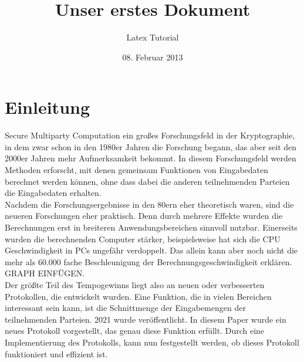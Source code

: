 \documentclass[a4paper,10pt]{scrartcl}
\title{Unser erstes Dokument}
\author{Latex Tutorial}
\date{08. Februar 2013}
\begin{document}
\maketitle
\tableofcontents

\newpage


\section{Einleitung}
Secure Multiparty Computation ein großes Forschungsfeld in der Kryptographie, in dem zwar schon in den 1980er Jahren die Forschung begann, das aber seit den 2000er Jahren mehr Aufmerksamkeit bekommt. \cite{Kogan2021}
In diesem Forschungsfeld werden Methoden erforscht, mit denen gemeinsam Funktionen von Eingabedaten berechnet werden können, ohne dass dabei die anderen teilnehmenden Parteien die Eingabedaten erhalten.\\
Nachdem die Forschungsergebnisse in den 80ern eher theoretisch waren, sind die neueren Forschungen eher praktisch. Denn durch mehrere Effekte wurden die Berechnungen erst in breiteren Anwendungsbereichen sinnvoll nutzbar. Einerseits wurden die berechnenden Computer stärker, beispielsweise hat sich die CPU Geschwindigkeit in PCs ungefähr verdoppelt. Das allein kann aber noch nicht die mehr als 60.000 fache Beschleunigung der Berechnungsgeschwindigkeit erklären. \cite{Kogan2021}
GRAPH EINFÜGEN.\\
Der größte Teil des Tempogewinns liegt also an neuen oder verbesserten Protokollen, die entwickelt wurden. Eine Funktion, die in vielen Bereichen interessant sein kann, ist die Schnittmenge der Eingabemengen der teilnehmenden Parteien. 2021 wurde \cite{Doettling2021} veröffentlicht. In diesem Paper wurde ein neues Protokoll vorgestellt, das genau diese Funktion erfüllt. Durch eine Implementierung des Protokolls, kann nun festgestellt werden, ob dieses Protokoll funktioniert und effizient ist.
\end{document}
